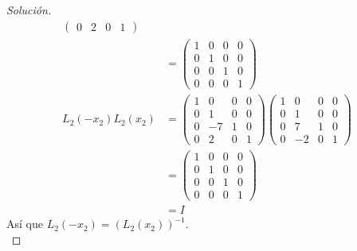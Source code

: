 \documentclass[12pt]{book}
\newenvironment{solucion}
  {\renewcommand\qedsymbol{$\square$}\begin{proof}[Solución]}
  {\end{proof}}
\begin{document}
\begin{solucion}
\begin{align*}
\begin{pmatrix}
    0 & 2 & 0 & 1
    \end{pmatrix}\\[8pt]
    &=\begin{pmatrix}
    1 & 0 & 0 & 0\\
    0 & 1 & 0 & 0\\
    0 & 0 & 1 & 0\\
    0 & 0 & 0 & 1
    \end{pmatrix}\\[8pt]
    L_2(-x_2)L_2(x_2)&=\begin{pmatrix}
    1 & 0 & 0 & 0\\
    0 & 1 & 0 & 0\\
    0 & -7 & 1 & 0\\
    0 & 2 & 0 & 1
    \end{pmatrix}\begin{pmatrix}
    1 & 0 & 0 & 0\\
    0 & 1 & 0 & 0\\
    0 & 7 & 1 & 0\\
    0 & -2 & 0 & 1
    \end{pmatrix}\\[8pt]
    &=\begin{pmatrix}
    1 & 0 & 0 & 0\\
    0 & 1 & 0 & 0\\
    0 & 0 & 1 & 0\\
    0 & 0 & 0 & 1
    \end{pmatrix}\\
    &=I
\end{align*}
Así que $L_2(-x_2)=\left(L_2(x_2)\right)^{-1}$.\\


\end{solucion}
\end{document}
